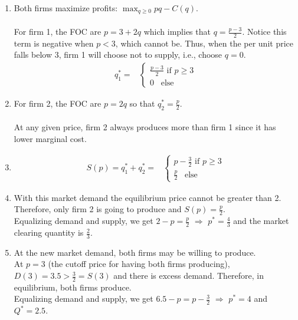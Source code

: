 \documentclass{article}
\newenvironment{solution}{\color{red}}{\color{black}}
\begin{document}
\begin{solution}

\begin{enumerate}
\item Both firms maximize profits: $\max_{q \geq 0} p q - C(q)$.\\ \\
For firm 1, the FOC are $p = 3 + 2 q$ which implies that $q = \frac{p-3}{2}$. Notice this term is negative when $p < 3$, which cannot be. Thus, when the per unit price falls below 3, firm 1 will choose not to supply, i.e., choose $q= 0$.
\begin{align*}
q_1^* 
=& \begin{cases} 
\frac{p-3}{2} \text{ if } p \geq 3\\
0 \, \, \, \text{ else}
\end{cases}
\end{align*}

\item For firm 2, the FOC are $p = 2q$ so that $q_2^* = \frac{p}{2}$.\\ \\
At any given price, firm 2 always produces more than firm 1 since it has lower
marginal cost.

\item 
\begin{align*}
S(p) = q_1^* + q_2^* 
=& \begin{cases} 
p - \frac{3}{2} \text{ if } p \geq 3\\
\frac{p}{2} \, \, \, \text{ else}
\end{cases}
\end{align*}

\item With this market demand the equilibrium price cannot be greater than 2. \\ 
Therefore, only firm 2 is going to produce and $S(p) = \frac{p}{2}$.\\ Equalizing demand and supply, we get $2-p = \frac{p}{2}$ $\Rightarrow$ $p^* = \frac{4}{3}$ and the market clearing quantity is  $\frac{2}{3}$.

\item At the new market demand, both firms may be willing to produce. \\
At $p=3$ (the cutoff price for having both firms producing), $D(3) = 3.5 > \frac{3}{2} = S(3)$ and there is excess demand. Therefore, in equilibrium, both firms produce. \\
Equalizing demand and supply, we get $6.5-p =p- \frac{3}{2}$ $\Rightarrow$ $p^* = 4$ and $Q^* =2.5$.


\end{enumerate}
\end{solution}
\end{document}
